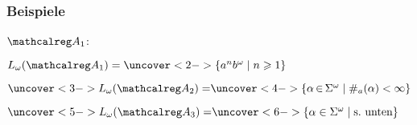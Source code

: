     \begin{frame}
      \frametitle{Beispiele}

      \begin{exampleblock}{}
        $\Aut{A}_1$:\quad {}
        \hfill
        \begin{minipage}{.55\textwidth}
          $L_\omega(\Aut{A}_1) = \uncover<2->{\{a^nb^\omega \mid n \geqslant 1\}}$
        \end{minipage}

        \par\bigskip
        \hfill
        \begin{minipage}{.55\textwidth}
          $\uncover<3->{L_\omega(\Aut{A}_2) = }\uncover<4->{\{\alpha\!\!\:\in\!\!\:\Sigma^\omega \mid \#_a(\alpha) < \infty\}}$
        \end{minipage}

        \par\bigskip
        \hfill
        \begin{minipage}{.55\textwidth}
          $\uncover<5->{L_\omega(\Aut{A}_3) = }\uncover<6->{\{\alpha \in \Sigma^\omega \mid \text{s.\ unten}\}}$
        \end{minipage}
        \par\bigskip


% 
% 
      \end{exampleblock}

    \end{frame}

